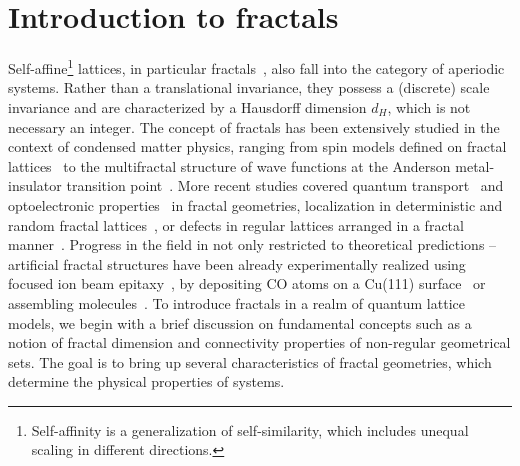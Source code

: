 \section{Introduction to fractals}
\label{sec:frac_intrl}

Self-affine\footnote{Self-affinity is a generalization of self-similarity, which includes unequal scaling in different directions.} lattices, in particular fractals~\cite{mandelbrot1983fractal}, also fall into the category of aperiodic systems. Rather than a translational invariance, they possess a (discrete) scale invariance and are characterized by a Hausdorff dimension $d_{H}$, which is not necessary an integer. The concept of fractals has been extensively studied in the context of condensed matter physics, ranging from spin models defined on fractal lattices~\cite{PhysRevLett.45.855, fractalIsing1998} to the multifractal structure of wave functions at the Anderson metal-insulator transition point~\cite{nakayama2013fractal}. More recent studies covered quantum transport~\cite{2016:TomadinTransport1} and optoelectronic properties~\cite{2017:YuanOptCond, plasmons} in fractal geometries, localization in deterministic and random fractal lattices~\cite{biblap1, biblap3, 2017:SachaRandFractal}, or defects in regular lattices arranged in a fractal manner~\cite{biblap2}. Progress in the field in not only restricted to theoretical predictions -- artificial fractal structures have been already experimentally realized using focused ion beam epitaxy~\cite{FIBSC}, by depositing CO atoms on a Cu(111) surface~\cite{Kempkes2019} or assembling molecules~\cite{Shang2015}. 
To introduce fractals in a realm of quantum lattice models, we begin with a brief discussion on fundamental concepts such as a notion of fractal dimension and connectivity properties of non-regular geometrical sets. The goal is to bring up several characteristics of fractal geometries, which determine the physical properties of systems.

